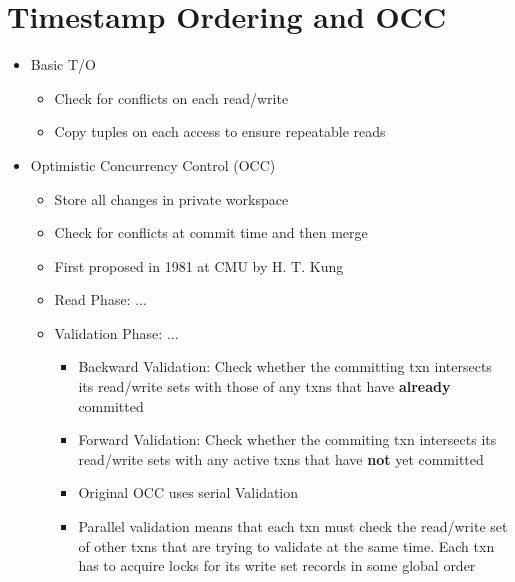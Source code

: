 \documentclass[11pt]{article}
\begin{document}
\section{Timestamp Ordering and OCC}
\begin{itemize}
    \item Basic T/O
    \begin{itemize}
        \item Check for conflicts on each read/write
        \item Copy tuples on each access to ensure repeatable reads
    \end{itemize}
    \item Optimistic Concurrency Control (OCC)
    \begin{itemize}
        \item Store all changes in private workspace
        \item Check for conflicts at commit time and then merge
        \item First proposed in 1981 at CMU by H. T. Kung ~\cite{p213-kung}
        \item Read Phase: ...
        \item Validation Phase: ...
        \begin{itemize}
            \item Backward Validation: Check whether the committing txn intersects its read/write sets with those of any txns that have \textbf{already} committed
            \item Forward Validation: Check whether the commiting txn intersects its read/write sets with any active txns that have \textbf{not} yet committed
            \item Original OCC uses serial Validation
            \item Parallel validation means that each txn must check the read/write set of other txns that are trying to validate at the same time. Each txn has to acquire locks for its write set records in some global order


\end{itemize}
\end{itemize}
\end{itemize}
\end{document}
